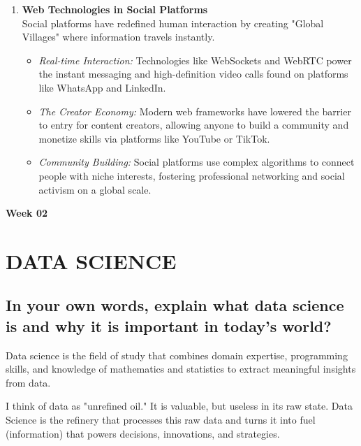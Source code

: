 \documentclass[a4paper,12pt]{article}
\begin{document}
\begin{enumerate}
    \item \textbf{Web Technologies in Social Platforms} \\
    Social platforms have redefined human interaction by creating "Global Villages" where information travels instantly.
    \begin{itemize}
        \item \textit{Real-time Interaction:} Technologies like WebSockets and WebRTC power the instant messaging and high-definition video calls found on platforms like WhatsApp and LinkedIn.
        \item \textit{The Creator Economy:} Modern web frameworks have lowered the barrier to entry for content creators, allowing anyone to build a community and monetize skills via platforms like YouTube or TikTok.
        \item \textit{Community Building:} Social platforms use complex algorithms to connect people with niche interests, fostering professional networking and social activism on a global scale.
    \end{itemize}
\end{enumerate}


\newpage                %
\begin{center}
    \vspace*{1cm}
    {\Huge \textbf{Week 02}} \\
    \vspace{0.5cm}
    \vspace{1cm}
\end{center}

\section{DATA SCIENCE}
\subsection{In your own words, explain what data science is and why it is important in today's world?}

Data science is the field of study that combines domain expertise, programming skills, and knowledge of mathematics and statistics to extract meaningful insights from data.

 I think of data as "unrefined oil." It is valuable, but useless in its raw state. Data Science is the refinery that processes this raw data and turns it into fuel (information) that powers decisions, innovations, and strategies.
\end{document}
